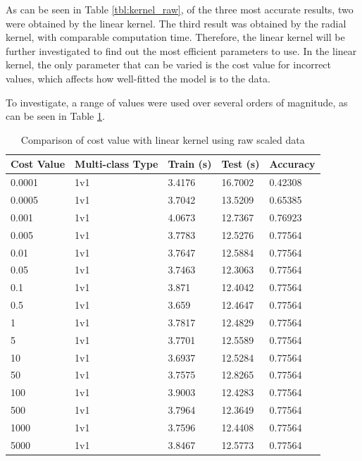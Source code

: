 \documentclass[a4paper, 10pt, conference]{ieeeconf}
\begin{document}
As can be seen in Table \ref{tbl:kernel_raw}, of the three most accurate results, two were obtained by the linear kernel. The third result was obtained by the radial kernel, with comparable computation time. Therefore, the linear kernel will be further investigated to find out the most efficient parameters to use. In the linear kernel, the only parameter that can be varied is the cost value for incorrect values, which affects how well-fitted the model is to the data.

To investigate, a range of values were used over several orders of magnitude, as can be seen in Table \ref{tbl:linear_params}.

\begin{table}
\centering
\label{tbl:linear_params}
\caption{Comparison of cost value with linear kernel using raw scaled data}
\begin{tabular}{lllll}
Cost Value & Multi-class Type & Train (s) & Test (s) & Accuracy\\ \hline
0.0001 & 1v1 & 3.4176 & 16.7002 & 0.42308\\ \hline
0.0005 & 1v1 & 3.7042 & 13.5209 & 0.65385\\ \hline
0.001 & 1v1 & 4.0673 & 12.7367 & 0.76923\\ \hline
0.005 & 1v1 & 3.7783 & 12.5276 & 0.77564\\ \hline
0.01 & 1v1 & 3.7647 & 12.5884 & 0.77564\\ \hline
0.05 & 1v1 & 3.7463 & 12.3063 & 0.77564\\ \hline
0.1 & 1v1 & 3.871 & 12.4042 & 0.77564\\ \hline
0.5 & 1v1 & 3.659 & 12.4647 & 0.77564\\ \hline
1 & 1v1 & 3.7817 & 12.4829 & 0.77564\\ \hline
5 & 1v1 & 3.7701 & 12.5589 & 0.77564\\ \hline
10 & 1v1 & 3.6937 & 12.5284 & 0.77564\\ \hline
50 & 1v1 & 3.7575 & 12.8265 & 0.77564\\ \hline
100 & 1v1 & 3.9003 & 12.4283 & 0.77564\\ \hline
500 & 1v1 & 3.7964 & 12.3649 & 0.77564\\ \hline
1000 & 1v1 & 3.7596 & 12.4408 & 0.77564\\ \hline
5000 & 1v1 & 3.8467 & 12.5773 & 0.77564\\ \hline

\end{tabular}
\end{table}
\end{document}
